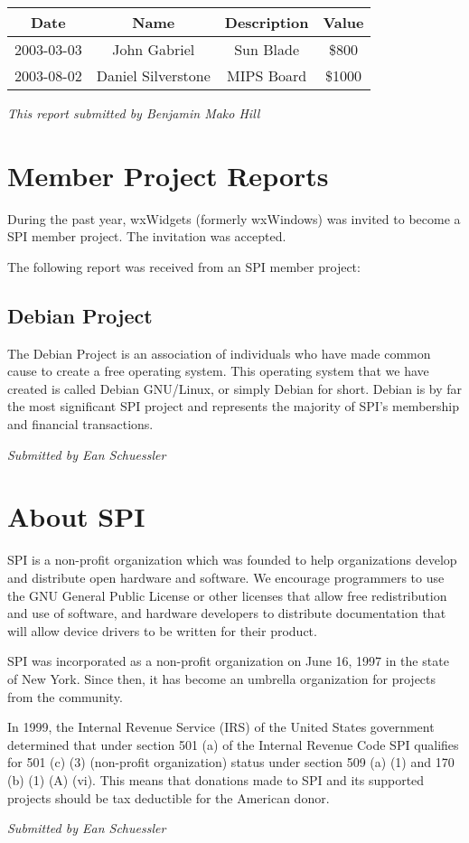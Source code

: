\documentclass[letterpaper]{report}
\begin{document}
\begin{tabular}{|c|c|c|c|}
\hline
Date & Name & Description & Value\tabularnewline
\hline
\hline
2003-03-03 & John Gabriel & Sun Blade & \$800\tabularnewline
\hline
2003-08-02 & Daniel Silverstone & MIPS Board & \$1000\tabularnewline
\hline
\end{tabular}

\emph{This report submitted by Benjamin Mako Hill}


\chapter{Member Project Reports}

During the past year, wxWidgets (formerly wxWindows) was invited to
become a SPI member project. The invitation was accepted.

The following report was received from an SPI member project:


\section{Debian Project}

The Debian Project is an association of individuals who have made
common cause to create a free operating system. This operating system
that we have created is called Debian GNU/Linux, or simply Debian
for short. Debian is by far the most significant SPI project and represents
the majority of SPI's membership and financial transactions.

\emph{Submitted by Ean Schuessler}

\appendix

\chapter{About SPI}

SPI is a non-profit organization which was founded to help organizations
develop and distribute open hardware and software. We encourage programmers
to use the GNU General Public License or other licenses that allow
free redistribution and use of software, and hardware developers to
distribute documentation that will allow device drivers to be written
for their product.

SPI was incorporated as a non-profit organization on June 16, 1997
in the state of New York. Since then, it has become an umbrella organization
for projects from the community.

In 1999, the Internal Revenue Service (IRS) of the United States government
determined that under section 501 (a) of the Internal Revenue Code
SPI qualifies for 501 (c) (3) (non-profit organization) status under
section 509 (a) (1) and 170 (b) (1) (A) (vi). This means that donations
made to SPI and its supported projects should be tax deductible for
the American donor.

\emph{Submitted by Ean Schuessler}
\end{document}
